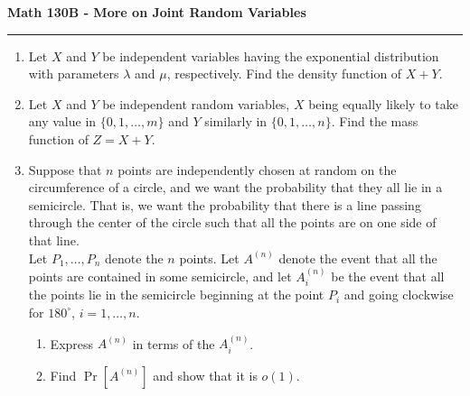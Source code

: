 \documentclass[11pt,letterpaper]{report}
\begin{document}
\begin{center}
{\bf \Large Math 130B - More on Joint Random Variables}
\vspace{0.2cm}
\hrule
\end{center}

\begin{enumerate}
	\item Let $X$ and $Y$ be independent variables having the exponential distribution with parameters $\lambda$ and $\mu$, respectively. Find the density function of $X+Y$.

	\vfill

	\item Let $X$ and $Y$ be independent random variables, $X$ being equally likely to take any value in $\{0, 1, \ldots, m\}$ and $Y$ similarly in $\{0, 1, \ldots, n\}$. Find the mass function of $Z = X+Y$.

	\vfill

	\item Suppose that $n$ points are independently chosen at random on the circumference of a circle, and we want the probability that they all lie in a semicircle. That is, we want the probability that there is a line passing through the center of the circle such that all the points are on one side of that line.\\

	\noindent Let $P_1, \ldots, P_n$ denote the $n$ points. Let $A^{(n)}$ denote the event that all the points are contained in some semicircle, and let $A^{(n)}_i$ be the event that all the points lie in the semicircle beginning at the point $P_i$ and going clockwise for $180^\circ$, $i = 1, \ldots, n$.
	\begin{enumerate}
		\item Express $A^{(n)}$ in terms of the $A^{(n)}_i$.
		\item Find $\Pr[A^{(n)}]$ and show that it is $o(1)$.
	\end{enumerate}

	\vfill


\end{enumerate}
\end{document}
